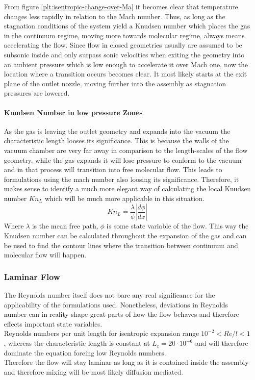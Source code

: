 	

	From figure \ref{plt:isentropic-change-over-Ma} it becomes clear that temperature changes less rapidly in relation to the Mach number.
	Thus, as long as the stagnation conditions of the system yield a Knudsen number which places the gas in the continuum regime, moving more towards molecular regime, always means accelerating the flow.
	Since flow in closed geometries usually are assumed to be subsonic inside and only surpass sonic velocities when exiting the geometry into an ambient pressure which is low enough to accelerate it over Mach one, now the location where a transition occurs becomes clear.
	It most likely starts at the exit plane of the outlet nozzle, moving further into the assembly as stagnation pressures are lowered.

	\paragraph{Knudsen Number in low pressure Zones}
		As the gas is leaving the outlet geometry and expands into the vacuum the characteristic length looses its significance.
		This is because the walls of the vacuum chamber are very far away in comparison to the length-scales of the flow geometry, while the gas expands it will lose pressure to conform to the vacuum and in that process will transition into free molecular flow.
		This leads to formulations using the mach number also loosing its significance.
		Therefore, it makes sense to identify a much more elegant way of calculating the local Knudsen number $Kn_L$ which will be much more applicable in this situation.
		\begin{equation}
			K n_L = \frac{\lambda}{\phi} \left| \frac{d\phi}{dx} \right|
		\end{equation}
		Where $\lambda$ is the mean free path, $\phi$ is some state variable of the flow.
		This way the Knudsen number can be calculated throughout the expansion of the gas and can be used to find the contour lines where the transition between continuum and molecular flow will happen. 
		\cite{bird_dsmc_2013, Grabe2008, LiLam1964}

\subsubsection*{Laminar Flow}
	The Reynolds number itself does not bare any real significance for the applicability of the formulations used. Nonetheless, deviations in Reynolds number can in reality shape great parts of how the flow behaves and therefore effects important state variables.\\
	Reynolds numbers per unit length for isentropic expansion range $10^{-2} < Re/l < 1$, whereas the characteristic length is constant at $L_c = 20\cdot 10^{-6}$ and will therefore dominate the equation forcing low Reynolds numbers. \cite{ames1953compressible}\\
	Therefore the flow will stay laminar as long as it is contained inside the assembly and therefore mixing will be most likely diffusion mediated.
	\cite{comsol_microfluidics_guide}
	

